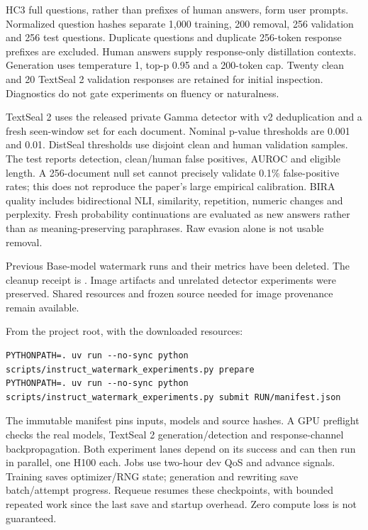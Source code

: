 HC3 full questions, rather than prefixes of human answers, form user
prompts. Normalized question hashes separate 1,000 training, 200
removal, 256 validation and 256 test questions. Duplicate questions and
duplicate 256-token response prefixes are excluded. Human answers supply
response-only distillation contexts. Generation uses temperature 1,
top-p 0.95 and a 200-token cap. Twenty clean and 20 TextSeal 2
validation responses are retained for initial inspection. Diagnostics do
not gate experiments on fluency or naturalness.

TextSeal 2 uses the released private Gamma detector with v2
deduplication and a fresh seen-window set for each document. Nominal
p-value thresholds are 0.001 and 0.01. DistSeal thresholds use disjoint
clean and human validation samples. The test reports detection,
clean/human false positives, AUROC and eligible length. A 256-document
null set cannot precisely validate 0.1\% false-positive rates; this does
not reproduce the paper's large empirical calibration. BIRA quality
includes bidirectional NLI, similarity, repetition, numeric changes and
perplexity. Fresh probability continuations are evaluated as new answers
rather than as meaning-preserving paraphrases. Raw evasion alone is not
usable removal.

Previous Base-model watermark runs and their metrics have been deleted.
The cleanup receipt is
\texttt{}.
Image artifacts and unrelated detector experiments were preserved.
Shared resources and frozen source needed for image provenance remain
available.

From the project root, with the downloaded resources:

\begin{Verbatim}
PYTHONPATH=. uv run --no-sync python scripts/instruct_watermark_experiments.py prepare
PYTHONPATH=. uv run --no-sync python scripts/instruct_watermark_experiments.py submit RUN/manifest.json
\end{Verbatim}

The immutable manifest pins inputs, models and source hashes. A GPU
preflight checks the real models, TextSeal 2 generation/detection and
response-channel backpropagation. Both experiment lanes depend on its
success and can then run in parallel, one H100 each. Jobs use two-hour
dev QoS and advance signals. Training saves optimizer/RNG state;
generation and rewriting save batch/attempt progress. Requeue resumes
these checkpoints, with bounded repeated work since the last save and
startup overhead. Zero compute loss is not guaranteed.

